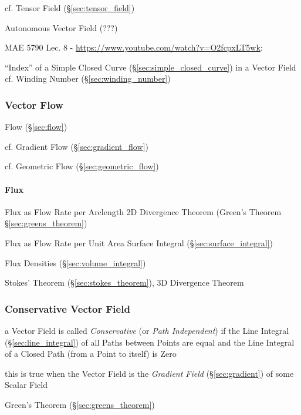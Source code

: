 cf. Tensor Field (\S\ref{sec:tensor_field})

Autonomous Vector Field (???)


MAE 5790 Lec. 8 - \url{https://www.youtube.com/watch?v=O2fcpxLT5wk}:

``Index'' of a Simple Closed Curve (\S\ref{sec:simple_closed_curve}) in a
Vector Field \fist cf. Winding Number (\S\ref{sec:winding_number})



\subsubsection{Vector Flow}\label{sec:vector_flow}

Flow (\S\ref{sec:flow})

cf. Gradient Flow (\S\ref{sec:gradient_flow})

cf. Geometric Flow (\S\ref{sec:geometric_flow})



\paragraph{Flux}\label{sec:flux}\hfill

Flux as Flow Rate per Arclength \fist 2D Divergence Theorem (Green's Theorem
\S\ref{sec:greens_theorem})

Flux as Flow Rate per Unit Area \fist Surface Integral
(\S\ref{sec:surface_integral})

Flux Densities \fist (\S\ref{sec:volume_integral})

Stokes' Theorem (\S\ref{sec:stokes_theorem}), 3D Divergence Theorem



\subsubsection{Conservative Vector Field}\label{sec:conservative_vector_field}

a Vector Field is called \emph{Conservative} (or \emph{Path Independent}) if
the Line Integral (\S\ref{sec:line_integral}) of all Paths between Points are
equal and the Line Integral of a Closed Path (from a Point to itself) is Zero

this is true when the Vector Field is the \emph{Gradient Field}
(\S\ref{sec:gradient}) of some Scalar Field

\fist Green's Theorem (\S\ref{sec:greens_theorem})



